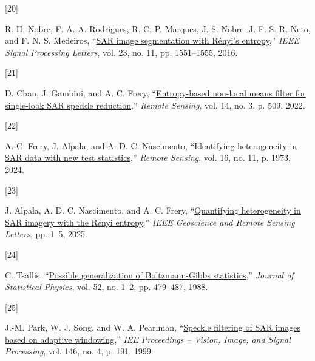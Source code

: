 \documentclass[
  lettersize  journal,
]{IEEEtran}%
\newlength{\cslhangindent}
\newlength{\csllabelwidth}
\newenvironment{CSLReferences}[2] %
 {\begin{list}{}{%
  \setlength{\itemindent}{0pt}
  \setlength{\leftmargin}{0pt}
  \setlength{\parsep}{0pt}
  \ifodd #1
   \setlength{\leftmargin}{\cslhangindent}
   \setlength{\itemindent}{-1\cslhangindent}
  \fi
  \setlength{\itemsep}{#2\baselineskip}}}
 {\end{list}}
\newcommand{\CSLLeftMargin}[1]{\parbox[t]{\csllabelwidth}{\strut#1\strut}}
\newcommand{\CSLRightInline}[1]{\parbox[t]{\linewidth - \csllabelwidth}{\strut#1\strut}}
\providecommand{\DIFaddbegin}{} %
\providecommand{\DIFaddend}{} %
\providecommand{\DIFdelbegin}{} %
\providecommand{\DIFdelend}{} %
\providecommand{\DIFscaledelfig}{0.5}
\newlength{\DIFdelgraphicswidth} %
\newlength{\DIFdelgraphicsheight} %
\providecommand{\DIFaddincludegraphics}[2][]{{\color{blue}\fbox{\DIFOincludegraphics[#1]{#2}}}} %
\providecommand{\DIFdelincludegraphics}[2][]{%
\sbox{\DIFdelgraphicsbox}{\DIFOincludegraphics[#1]{#2}}%
\settoboxwidth{\DIFdelgraphicswidth}{\DIFdelgraphicsbox} %
\settoboxtotalheight{\DIFdelgraphicsheight}{\DIFdelgraphicsbox} %
\scalebox{\DIFscaledelfig}{%
\parbox[b]{\DIFdelgraphicswidth}{\usebox{\DIFdelgraphicsbox}\\[-\baselineskip] \rule{\DIFdelgraphicswidth}{0em}}\llap{\resizebox{\DIFdelgraphicswidth}{\DIFdelgraphicsheight}{%
\setlength{\unitlength}{\DIFdelgraphicswidth}%
\begin{picture}(1,1)%
\thicklines\linethickness{2pt} %
{\color[rgb]{1,0,0}\put(0,0){\framebox(1,1){}}}%
{\color[rgb]{1,0,0}\put(0,0){\line( 1,1){1}}}%
{\color[rgb]{1,0,0}\put(0,1){\line(1,-1){1}}}%
\end{picture}%
}\hspace*{3pt}}} %
} %
\DeclareRobustCommand{\DIFaddbegin}{\DIFOaddbegin \let\includegraphics\DIFaddincludegraphics} %
\DeclareRobustCommand{\DIFaddend}{\DIFOaddend \let\includegraphics\DIFOincludegraphics} %
\DeclareRobustCommand{\DIFdelbegin}{\DIFOdelbegin \let\includegraphics\DIFdelincludegraphics} %
\DeclareRobustCommand{\DIFdelend}{\DIFOaddend \let\includegraphics\DIFOincludegraphics} %
\begin{document}
\begin{CSLReferences}{0}{0}
\DIFdelbegin %
\DIFdelend \DIFaddbegin \CSLLeftMargin{{[}20{]} }\DIFaddend %
\CSLRightInline{R. H. Nobre, F. A. A. Rodrigues, R. C. P. Marques, J. S.
Nobre, J. F. S. R. Neto, and F. N. S. Medeiros,
{``\href{https://doi.org/10.1109/lsp.2016.2606760}{SAR image
segmentation with {R}ényi's entropy},''} \emph{IEEE Signal Processing
Letters}, vol. 23, no. 11, pp. 1551--1555, 2016. }

\DIFdelbegin %
\DIFdelend \DIFaddbegin \CSLLeftMargin{{[}21{]} }\DIFaddend %
\CSLRightInline{D. Chan, J. Gambini, and A. C. Frery,
{``\href{https://doi.org/10.3390/rs14030509}{Entropy-based non-local
means filter for single-look SAR speckle reduction},''} \emph{Remote
Sensing}, vol. 14, no. 3, p. 509, 2022. }

\DIFdelbegin %
\DIFdelend \DIFaddbegin \CSLLeftMargin{{[}22{]} }\DIFaddend %
\CSLRightInline{A. C. Frery, J. Alpala, and A. D. C. Nascimento,
{``\href{https://doi.org/10.3390/rs16111973}{Identifying heterogeneity
in {SAR} data with new test statistics},''} \emph{Remote Sensing}, vol.
16, no. 11, p. 1973, 2024. }

\DIFdelbegin %
\DIFdelend \DIFaddbegin \CSLLeftMargin{{[}23{]} }\DIFaddend %
\CSLRightInline{J. Alpala, A. D. C. Nascimento, and A. C. Frery,
{``\href{https://doi.org/10.1109/lgrs.2025.3581855}{Quantifying
heterogeneity in SAR imagery with the {R}ényi entropy},''} \emph{IEEE
Geoscience and Remote Sensing Letters}, pp. 1--5, 2025. }

\DIFdelbegin %
\DIFdelend \DIFaddbegin \CSLLeftMargin{{[}24{]} }\DIFaddend %
\CSLRightInline{C. Tsallis,
{``\href{https://doi.org/10.1007/bf01016429}{Possible generalization of
{B}oltzmann-{G}ibbs statistics},''} \emph{Journal of Statistical
Physics}, vol. 52, no. 1--2, pp. 479--487, 1988. }

\DIFdelbegin %
\DIFdelend \DIFaddbegin \CSLLeftMargin{{[}25{]} }\DIFaddend %
\CSLRightInline{J.-M. Park, W. J. Song, and W. A. Pearlman,
{``\href{https://doi.org/10.1049/ip-vis:19990550}{Speckle filtering of
SAR images based on adaptive windowing},''} \emph{IEE Proceedings --
Vision, Image, and Signal Processing}, vol. 146, no. 4, p. 191, 1999. }


\end{CSLReferences}
\end{document}
